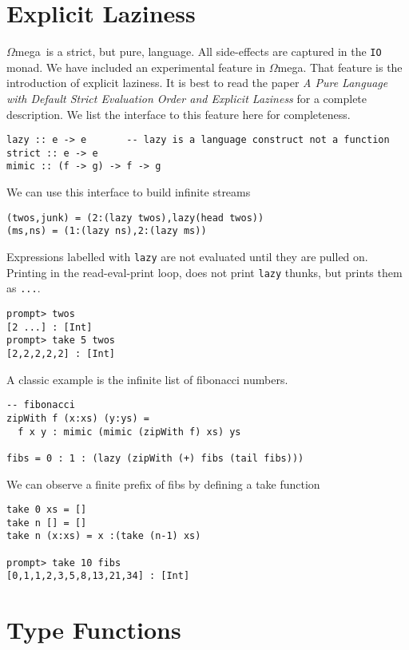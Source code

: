 \documentclass[11pt,twoside]{article}
\newcommand{\om}{$\Omega$mega}
\begin{document}
\section{Explicit Laziness} \label{lazy}
\om\ is a strict, but pure, language. All side-effects are captured
in the {\tt IO} monad. We have included an experimental feature in \om.
That feature is the introduction of explicit laziness. It is best
to read the paper 
{\em A Pure Language with Default Strict Evaluation Order and Explicit Laziness}\cite{SheardStrict}
for a complete description. We list the interface to this feature 
here for completeness.

\begin{verbatim}
lazy :: e -> e       -- lazy is a language construct not a function
strict :: e -> e
mimic :: (f -> g) -> f -> g
\end{verbatim}
We can use this interface to build infinite streams
\begin{verbatim}
(twos,junk) = (2:(lazy twos),lazy(head twos))
(ms,ns) = (1:(lazy ns),2:(lazy ms)) 
\end{verbatim}
Expressions labelled with {\tt lazy} are not evaluated until
they are pulled on. Printing in the read-eval-print loop, does not
print {\tt lazy} thunks, but prints them as {\tt ...}.
\begin{verbatim}
prompt> twos
[2 ...] : [Int]
prompt> take 5 twos
[2,2,2,2,2] : [Int]
\end{verbatim}

A classic example is the infinite list of fibonacci numbers.
\begin{verbatim}
-- fibonacci
zipWith f (x:xs) (y:ys) = 
  f x y : mimic (mimic (zipWith f) xs) ys

fibs = 0 : 1 : (lazy (zipWith (+) fibs (tail fibs)))
\end{verbatim}

We can observe a finite prefix of fibs by defining a take function

\begin{verbatim}
take 0 xs = []
take n [] = []
take n (x:xs) = x :(take (n-1) xs)

prompt> take 10 fibs
[0,1,1,2,3,5,8,13,21,34] : [Int]
\end{verbatim}

\section{Type Functions} \label{typefun}
\end{document}
